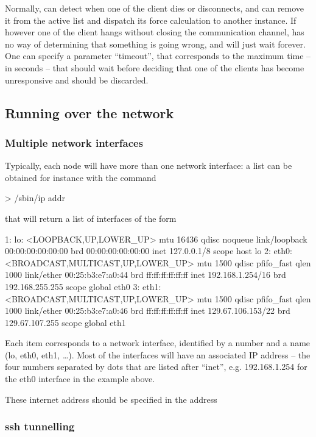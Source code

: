 \documentclass[11pt,english,fleqn]{report}
\newenvironment{code}{%
\footnotesize 
\verbatim
}{
\endverbatim
\normalsize
}
\begin{document}
Normally, \ipi can detect when one of the client dies or disconnects,
and can remove it from the active list and dispatch its force calculation
to another instance. If however one of the client hangs without 
closing the communication channel, \ipi has no way of determining that
something is going wrong, and will just wait forever. One can 
specify a parameter ``timeout'', that corresponds to the maximum time -- in 
seconds -- that \ipi should wait before deciding that one of the clients
has become unresponsive and should be discarded.

\subsection{Running \ipi over the network}

\subsubsection{Multiple network interfaces}


Typically, each node will have more than one network interface: a list
can be obtained for instance with the command
%
\begin{code}
> /sbin/ip addr
\end{code}
%
that will return a list of interfaces of the form
%
\begin{code}
1: lo: <LOOPBACK,UP,LOWER_UP> mtu 16436 qdisc noqueue 
    link/loopback 00:00:00:00:00:00 brd 00:00:00:00:00:00
    inet 127.0.0.1/8 scope host lo
2: eth0: <BROADCAST,MULTICAST,UP,LOWER_UP> mtu 1500 qdisc pfifo_fast qlen 1000
    link/ether 00:25:b3:e7:a0:44 brd ff:ff:ff:ff:ff:ff
    inet 192.168.1.254/16 brd 192.168.255.255 scope global eth0
3: eth1: <BROADCAST,MULTICAST,UP,LOWER_UP> mtu 1500 qdisc pfifo_fast qlen 1000
    link/ether 00:25:b3:e7:a0:46 brd ff:ff:ff:ff:ff:ff
    inet 129.67.106.153/22 brd 129.67.107.255 scope global eth1
\end{code}
%
Each item corresponds to a network interface, identified by a number and a name (lo, eth0, eth1, \ldots).
Most of the interfaces will have an associated IP address -- the four numbers separated by dots
that are listed after ``inet'', e.g. 192.168.1.254 for the eth0 interface in the example above.

These internet address should be specified in the address 

\subsubsection{ssh tunnelling}
\end{document}
